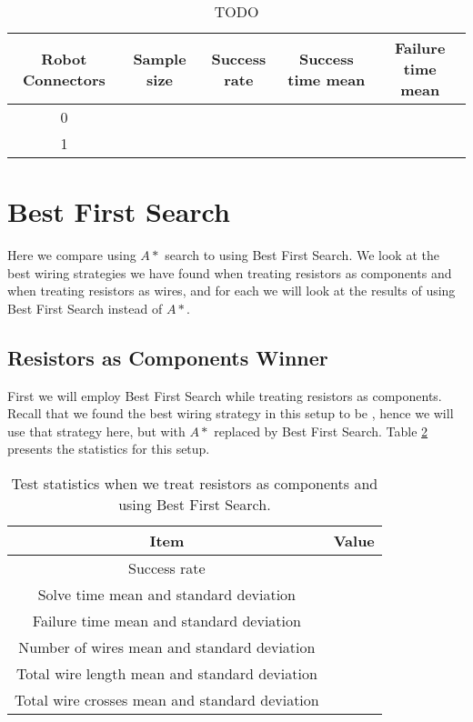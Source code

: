 \begin{table}[H]
\begin{center}
\begin{singlespace}
\begin{tabular}{| c | c | c | c | c |}
\hline
Robot Connectors & Sample size & Success rate & Success time mean &
Failure time mean\\
\hline\hline
0 & & & & \\
1 & & & & \\
\hline
\end{tabular}
\end{singlespace}
\end{center}
\label{tb:TODO}
\caption{TODO}
\end{table}

\section{Best First Search}

Here we compare using $A*$ search to using Best First Search. We look at the
best wiring strategies we have found when treating resistors as components and
when treating resistors as wires, and for each we will look at the results of
using Best First Search instead of $A*$.

\subsection{Resistors as Components Winner}

First we will employ Best First Search while treating resistors as components.
Recall
that we found the best wiring strategy in this setup to be \q, hence we will use
that strategy here, but with $A*$ replaced by Best First Search. Table
\ref{tb:as_comp_best_first} presents the statistics for this setup.

\begin{table}[H]
\begin{center}
\begin{singlespace}
\begin{tabular}{| c | c |}
\hline
Item & Value \\
\hline\hline
Success rate & \\
Solve time mean and standard deviation & \\
Failure time mean and standard deviation & \\
Number of wires mean and standard deviation & \\
Total wire length mean and standard deviation & \\
Total wire crosses mean and standard deviation & \\
\hline
\end{tabular}
\end{singlespace}
\end{center}
\label{tb:as_comp_best_first}
\caption{Test statistics when we treat resistors as components and \q using Best
First Search.}
\end{table}

